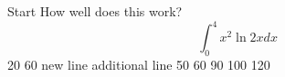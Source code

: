 \documentclass{article}
\begin{document}
Start
How well does this work?
$$\int_0^4 x^2 \ln{2x}dx$$
20
60
new line
additional line
50
60
90
100
120
\end{document}
